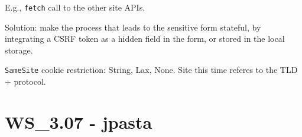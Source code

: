 E.g., \texttt{fetch} call to the other site APIs.

Solution: make the process that leads to the sensitive form stateful, by integrating a CSRF token as a hidden field in the form, or stored in the local storage.

\texttt{SameSite} cookie restriction: String, Lax, None. Site this time referes to the TLD + protocol.

\section{WS_3.07 - jpasta}
